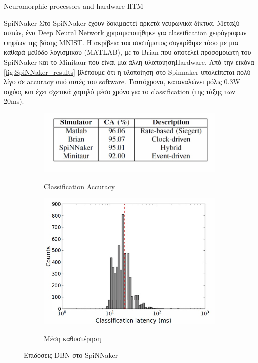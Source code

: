 \documentclass[a4paper,11pt]{article}
\begin{document}
\begin{section}{Neuromorphic processors and hardware HTM}
\begin{subsection}{SpiNNaker}
    Στο SpiNNaker έχουν δοκιμαστεί αρκετά νευρωνικά δίκτυα. Μεταξύ αυτών, ένα Deep Neural Network χρησιμοποιήθηκε για classification χειρόγραφων ψηφίων της βάσης MNIST. H ακρίβεια του συστήματος συγκρίθηκε τόσο με μια καθαρά μεθόδο λογισμικού (MATLAB), με το Brian που αποτελεί προσομοιωτή του SpiNNaker και το Minitaur που είναι μια άλλη υλοποίησηHardware. Από την εικόνα \eqref{fig:SpiNNaker_results} βλέπουμε ότι η υλοποίηση στο Spinnaker υπολείπεται πολύ λίγο σε accuracy από αυτές του software.
    Ταυτόχρονα, καταναλώνει μόλις 0.3W ισχύος και έχει σχετικά χαμηλό μέσο χρόνο για το classification (της τάξης των 20ms).
    \begin{figure} [H]
      \centering%
      \begin{subfigure}{0.5\columnwidth}
        {\includegraphics[width=\columnwidth,clip=true]{pics/Accuracy.jpg}}
        \caption{Classification Accuracy}\label{fig:SpiNNaker_results}
      \end{subfigure}%
      \begin{subfigure}{0.5\columnwidth}
        \centering
        {\includegraphics[width=0.9\columnwidth,clip=true]{pics/Latencies.jpg}}
        \caption{Μέση καθυστέρηση}\label{fig:Spinnaker_time}
      \end{subfigure}
      \caption{Επιδόσεις DBN στο SpiNNaker}
    \end{figure}


\end{subsection}
\end{section}
\end{document}
